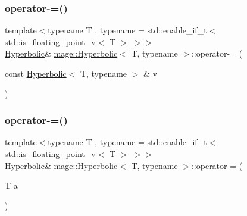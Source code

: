\subsubsection{\texorpdfstring{operator-\/=()}{operator-=()}\hspace{0.1cm}{\footnotesize\ttfamily [1/2]}}
{\footnotesize\ttfamily template$<$typename T , typename  = std\+::enable\+\_\+if\+\_\+t$<$ std\+::is\+\_\+floating\+\_\+point\+\_\+v$<$ T $>$ $>$$>$ \\
\mbox{\hyperlink{structmage_1_1_hyperbolic}{Hyperbolic}}\& \mbox{\hyperlink{structmage_1_1_hyperbolic}{mage\+::\+Hyperbolic}}$<$ T, typename $>$\+::operator-\/= (\begin{DoxyParamCaption}\item[{const \mbox{\hyperlink{structmage_1_1_hyperbolic}{Hyperbolic}}$<$ T, typename $>$ \&}]{v }\end{DoxyParamCaption})\hspace{0.3cm}{\ttfamily [noexcept]}}

\mbox{\label{structmage_1_1_hyperbolic_ac01422f8f5f1e54fa9049679f24e54cc}} 
\subsubsection{\texorpdfstring{operator-\/=()}{operator-=()}\hspace{0.1cm}{\footnotesize\ttfamily [2/2]}}
{\footnotesize\ttfamily template$<$typename T , typename  = std\+::enable\+\_\+if\+\_\+t$<$ std\+::is\+\_\+floating\+\_\+point\+\_\+v$<$ T $>$ $>$$>$ \\
\mbox{\hyperlink{structmage_1_1_hyperbolic}{Hyperbolic}}\& \mbox{\hyperlink{structmage_1_1_hyperbolic}{mage\+::\+Hyperbolic}}$<$ T, typename $>$\+::operator-\/= (\begin{DoxyParamCaption}\item[{T}]{a }\end{DoxyParamCaption})\hspace{0.3cm}{\ttfamily [noexcept]}}

\mbox{\label{structmage_1_1_hyperbolic_a95a357cfc21a1b3b0eb7944a04c92398}} 
